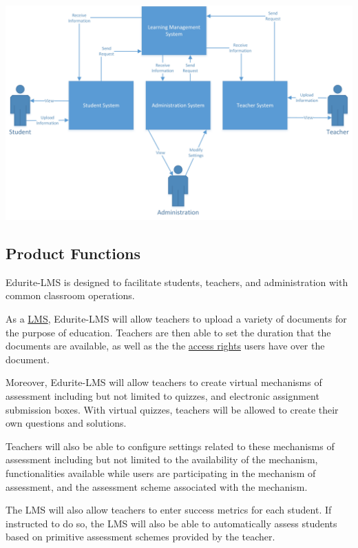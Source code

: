 \documentclass[]{article}
\begin{document}
\begin{center}
\includegraphics[scale=0.7]{A1_Assets/2-1_Product_Perspective_Diagram.jpg}
\end{center}


\subsection{Product Functions}
\label{sub:product_functions}
Edurite-LMS is designed to facilitate students, teachers, and administration
with common classroom operations.

As a \underline{LMS}, Edurite-LMS will allow teachers to upload a variety of documents for
the purpose of education. Teachers are then able to set the duration that the
documents are available, as well as the the \underline{access rights} users
have over the document.

Moreover, Edurite-LMS will allow teachers to create virtual mechanisms of
assessment including but not limited to quizzes, and electronic assignment
submission boxes. With virtual quizzes, teachers will be allowed to create their
own questions and solutions.

Teachers will also be able to configure settings related to these mechanisms of
assessment including but not limited to the availability of the mechanism,
functionalities available while users are participating in the mechanism of
assessment, and the assessment scheme associated with the mechanism.

The LMS will also allow teachers to enter success metrics for each student. If
instructed to do so, the LMS will also be able to automatically assess students
based on primitive assessment schemes provided by the teacher.
\end{document}

